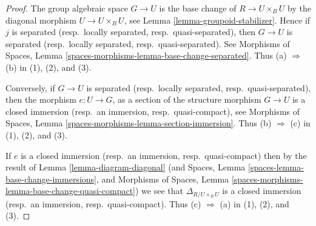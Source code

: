 \begin{proof}
The group algebraic space $G \to U$ is the base change of $R \to U \times_B U$
by the diagonal morphism $U \to U \times_B U$, see
Lemma \ref{lemma-groupoid-stabilizer}. Hence if
$j$ is separated (resp.\ locally separated, resp.\ quasi-separated),
then $G \to U$ is separated (resp.\ locally separated, resp.\ quasi-separated).
See
Morphisms of Spaces, Lemma
\ref{spaces-morphisms-lemma-base-change-separated}.
Thus (a) $\Rightarrow$ (b) in (1), (2), and (3).

\medskip\noindent
Conversely, if $G \to U$ is separated
(resp.\ locally separated, resp.\ quasi-separated), then the morphism
$e : U \to G$, as a section of the structure morphism $G \to U$ is a closed
immersion (resp.\ an immersion, resp.\ quasi-compact), see
Morphisms of Spaces, Lemma \ref{spaces-morphisms-lemma-section-immersion}.
Thus (b) $\Rightarrow$ (c) in (1), (2), and (3).

\medskip\noindent
If $e$ is a closed immersion (resp.\ an immersion, resp.\ quasi-compact)
then by the result of
Lemma \ref{lemma-diagram-diagonal}
(and
Spaces, Lemma \ref{spaces-lemma-base-change-immersions}, and
Morphisms of Spaces,
Lemma \ref{spaces-morphisms-lemma-base-change-quasi-compact})
we see that $\Delta_{R/U \times_B U}$ is a closed
immersion (resp.\ an immersion, resp.\ quasi-compact).
Thus (c) $\Rightarrow$ (a) in (1), (2), and (3).
\end{proof}






















